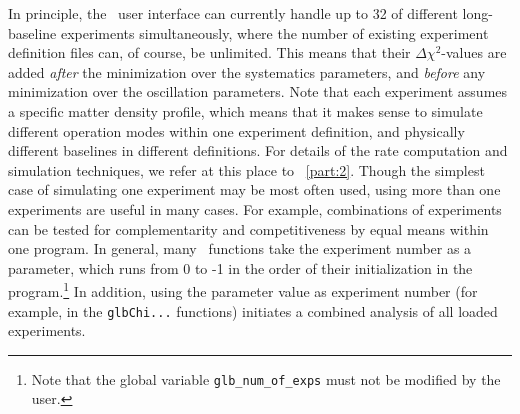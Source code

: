 In principle, the \GLOBES\ user interface can currently handle up to 32 of different long-baseline experiments simultaneously, where the number
of existing experiment definition files can, of course, be unlimited. This means that their $\Delta \chi^2$-values are added {\em after} the minimization over the systematics parameters, and {\em before} any minimization over the oscillation parameters. Note that each experiment
assumes a specific matter density profile, which means
that it makes sense to simulate different operation modes within one
experiment definition, and physically different baselines in different
definitions. For details of the rate computation and
simulation techniques, we refer at this place to \Part~\ref{part:2}. Though
 the simplest case of simulating one experiment may be most often used, 
 using more than one experiments are useful in many cases. For example, combinations of experiments can be tested for
complementarity and competitiveness by equal means within one program.
In general, many \GLOBES\ functions take the experiment number as
a parameter, which runs from $0$ to -1 in the order of their initialization in the program.\footnote{Note that
the global variable {\tt glb\_num\_of\_exps} must not be modified by the
user.} In addition, using the parameter value  as
experiment number (for example, in the {\tt glbChi...} functions) initiates a combined analysis of all loaded experiments.

%

